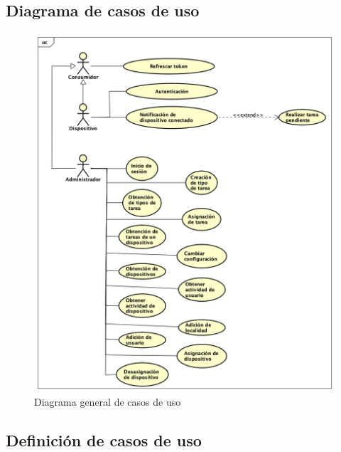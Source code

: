 \subsection{Diagrama de casos de uso}

\begin{figure}[H]
    \centering
    \includegraphics[width=14cm]{./img/uc.png}
    \caption{Diagrama general de casos de uso}
    \label{fig:seq.alive}
\end{figure}

\subsection{Definición de casos de uso}


